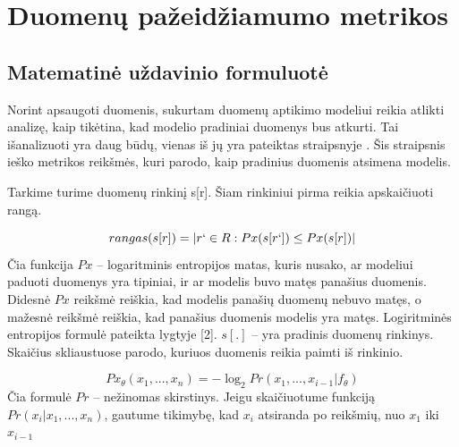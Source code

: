 \documentclass{VUMIFInfBakalaurinis}
\begin{document}




\section{Duomenų pažeidžiamumo metrikos}

\subsection{Matematinė uždavinio formuluotė}
\par Norint apsaugoti duomenis, sukurtam duomenų aptikimo modeliui reikia atlikti analizę, kaip tikėtina, kad modelio pradiniai duomenys bus atkurti. Tai išanalizuoti yra daug būdų, vienas iš jų yra pateiktas straipsnyje \cite{11}.
 Šis straipsnis ieško metrikos reikšmės, kuri parodo, kaip pradinius duomenis atsimena modelis.
\par Tarkime turime duomenų rinkinį s[r]. Šiam rinkiniui pirma reikia apskaičiuoti rangą.

\begin{equation}
rangas(s[r]) = | {r` \in R : Px(s[r`]) \leq Px(s[r])} |
\label{eq:Lygtis 1.}
\end{equation}
Čia funkcija $Px$ -- logaritminis entropijos matas, kuris nusako, ar modeliui paduoti duomenys yra tipiniai, ir ar modelis buvo matęs panašius duomenis. Didesnė $Px$ reikšmė reiškia, kad modelis panašių duomenų nebuvo matęs, o mažesnė reikšmė reiškia, kad panašius duomenis modelis yra matęs. Logiritminės entropijos formulė pateikta lygtyje [2]. $s[.]$ -- yra pradinis duomenų rinkinys. Skaičius skliaustuose parodo, kuriuos duomenis reikia paimti iš rinkinio.

\begin{equation}
Px_{\theta}(x_{1}, ..., x_{n}) = -\log_{2} Pr(x_{1}, ..., x_{i - 1} | f_{\theta})
\label{eq:Lygtis 2.}
\end{equation}
Čia formulė $Pr$ -- nežinomas skirstinys. Jeigu skaičiuotume funkciją $Pr(x_{i} | x_{1}, ..., x_{n})$, gautume tikimybę, kad $x_{i}$ atsiranda po reikšmių, nuo $x_{1}$ iki $x_{i-1}$
\end{document}
